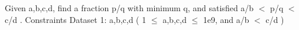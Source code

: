 Given a,b,c,d, find a fraction p/q with minimum q, and satisfied a/b $<$ p/q $<$ c/d .
   Constraints  
Dataset 1: a,b,c,d ( 1  $\le$  a,b,c,d  $\le$  1e9, and a/b $<$ c/d )